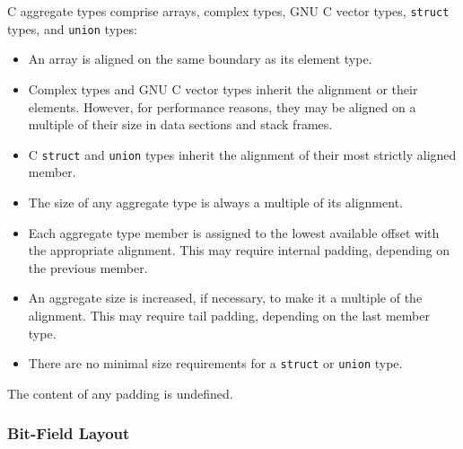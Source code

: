 C aggregate types comprise arrays, complex types, GNU C vector types,
\verb|struct| types, and \verb|union| types: \begin{itemize}

\item An array is aligned on the same boundary as its element type.

\item Complex types and GNU C vector types inherit the alignment or their
    elements.  However, for performance reasons, they may be aligned on a
    multiple of their size in data sections and stack frames.

\item C \verb|struct| and \verb|union| types inherit the alignment of their most
    strictly aligned member.

\item The size of any aggregate type is always a multiple of its alignment.

\item Each aggregate type member is assigned to the lowest available offset with
    the appropriate alignment. This may require internal padding, depending on
    the previous member.

\item An aggregate size is increased, if necessary, to make it a multiple of the
    alignment. This may require tail padding, depending on the last member type.

\item There are no minimal size requirements for a \verb|struct| or \verb|union| type.

\end{itemize} The content of any padding is undefined.

\subsubsection{Bit-Field Layout}


